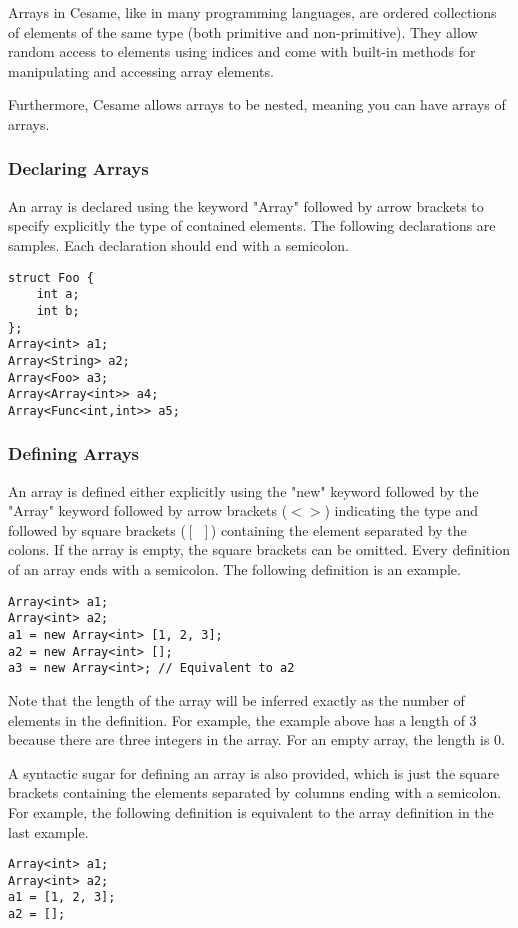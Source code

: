Arrays in Cesame, like in many programming languages, are ordered collections of elements of the same type (both primitive and non-primitive). They allow random access to elements using indices and come with built-in methods for manipulating and accessing array elements. 

Furthermore, Cesame allows arrays to be nested, meaning you can have arrays of arrays.

\subsubsection{Declaring Arrays}
An array is declared using the keyword "Array" followed by arrow brackets to specify explicitly the type of contained elements. The following declarations are samples. Each declaration should end with a semicolon.
\begin{lstlisting}[caption={array\_declaration.csm}, captionpos=b]
struct Foo {
    int a;
    int b;
};
Array<int> a1;
Array<String> a2;
Array<Foo> a3;
Array<Array<int>> a4;
Array<Func<int,int>> a5;
\end{lstlisting}

\subsubsection{Defining Arrays}
An array is defined either explicitly using the "new" keyword followed by the "Array" keyword followed by arrow brackets ($<>$) indicating the type and followed by square brackets ($[\ \ ]$) containing the element separated by the colons. If the array is empty, the square brackets can be omitted. Every definition of an array ends with a semicolon. The following definition is an example.
\begin{lstlisting}[caption={array\_definition.csm}, captionpos=b]
Array<int> a1;
Array<int> a2;
a1 = new Array<int> [1, 2, 3];
a2 = new Array<int> [];
a3 = new Array<int>; // Equivalent to a2

\end{lstlisting}
Note that the length of the array will be inferred exactly as the number of elements in the definition. For example, the example above has a length of 3 because there are three integers in the array. For an empty array, the length is 0.
\par A syntactic sugar for defining an array is also provided, which is just the square brackets containing the elements separated by columns ending with a semicolon. For example, the following definition is equivalent to the array definition in the last example.
\begin{lstlisting}[caption={array\_definition\_short.csm}, captionpos=b]
Array<int> a1;
Array<int> a2;
a1 = [1, 2, 3];
a2 = [];


\end{lstlisting}

